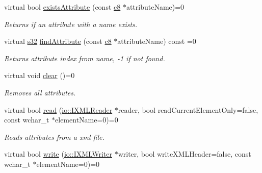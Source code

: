 \begin{DoxyCompactItemize}
\mbox{\label{classirr_1_1io_1_1IAttributes_ae2b4783b220e424269beee14674babb3}} 
virtual bool \hyperlink{classirr_1_1io_1_1IAttributes_ae2b4783b220e424269beee14674babb3}{exists\+Attribute} (const \hyperlink{namespaceirr_a9395eaea339bcb546b319e9c96bf7410}{c8} $\ast$attribute\+Name)=0
\begin{DoxyCompactList}\small\item\em Returns if an attribute with a name exists. \end{DoxyCompactList}\item 
\mbox{\label{classirr_1_1io_1_1IAttributes_abda2f84c5b87d69d9008485740afcb7c}} 
virtual \hyperlink{namespaceirr_ac66849b7a6ed16e30ebede579f9b47c6}{s32} \hyperlink{classirr_1_1io_1_1IAttributes_abda2f84c5b87d69d9008485740afcb7c}{find\+Attribute} (const \hyperlink{namespaceirr_a9395eaea339bcb546b319e9c96bf7410}{c8} $\ast$attribute\+Name) const =0
\begin{DoxyCompactList}\small\item\em Returns attribute index from name, -\/1 if not found. \end{DoxyCompactList}\item 
\mbox{\label{classirr_1_1io_1_1IAttributes_ab33109fc1b62432973a49b794231a061}} 
virtual void \hyperlink{classirr_1_1io_1_1IAttributes_ab33109fc1b62432973a49b794231a061}{clear} ()=0
\begin{DoxyCompactList}\small\item\em Removes all attributes. \end{DoxyCompactList}\item 
virtual bool \hyperlink{classirr_1_1io_1_1IAttributes_a9001fd2760cba4e1b13efc6539c0f441}{read} (\hyperlink{namespaceirr_1_1io_ab620b13630f0818f3eefc000f6917fe4}{io\+::\+I\+X\+M\+L\+Reader} $\ast$reader, bool read\+Current\+Element\+Only=false, const wchar\+\_\+t $\ast$element\+Name=0)=0
\begin{DoxyCompactList}\small\item\em Reads attributes from a xml file. \end{DoxyCompactList}\item 
virtual bool \hyperlink{classirr_1_1io_1_1IAttributes_a5a32fcdfca5426cccf69e8f654a0050c}{write} (\hyperlink{classirr_1_1io_1_1IXMLWriter}{io\+::\+I\+X\+M\+L\+Writer} $\ast$writer, bool write\+X\+M\+L\+Header=false, const wchar\+\_\+t $\ast$element\+Name=0)=0

\end{DoxyCompactItemize}
